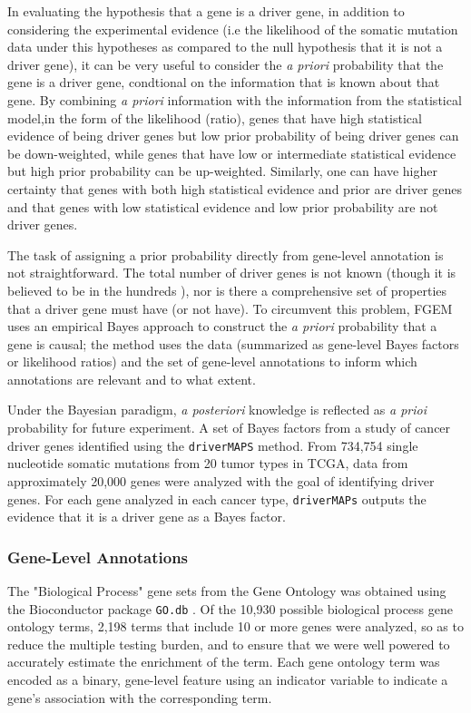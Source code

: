 In evaluating the hypothesis that a gene is a driver gene, in addition to considering the experimental evidence (i.e the likelihood of the somatic mutation data under this hypotheses as compared to the null hypothesis that it is not a driver gene), it can be very useful to consider the \emph{a priori} probability that the gene is a driver gene, condtional on the information that is known about that gene.  By combining \emph{a priori} information with the information from the statistical model,in the form of the likelihood (ratio), genes that have high statistical evidence of being driver genes but low prior probability of being driver genes can be down-weighted, while genes that have low or intermediate statistical evidence but high prior probability can be up-weighted.  Similarly, one can have higher certainty that genes with  both high statistical evidence and prior are driver genes and that genes with low statistical evidence and low prior probability are not driver genes.

The task of assigning a prior probability directly from gene-level annotation is not straightforward.  The total number of driver genes is not known (though it is believed to be in the hundreds \cite{Bailey_2018}), nor is there a comprehensive set of properties that a driver gene must have (or not have).  To circumvent this problem, FGEM uses an empirical Bayes approach to construct the \emph{a priori} probability that a gene is causal; the method uses the data (summarized as gene-level Bayes factors or likelihood ratios) and the set of gene-level annotations to inform which annotations are relevant and to what extent.

Under the Bayesian paradigm, \emph{a posteriori} knowledge is reflected as \emph{a prioi} probability for future experiment.  A set of Bayes factors from a study of cancer driver genes identified using the \texttt{driverMAPS} method\cite{drivermaps}.  From 734,754 single nucleotide somatic mutations from 20 tumor types in TCGA, data from approximately 20,000 genes were analyzed with the goal of identifying driver genes. For each gene analyzed in each cancer type, \texttt{driverMAPs} outputs the evidence that it is a driver gene as a Bayes factor.  

\subsubsection{Gene-Level Annotations}\label{sec:orgd117550}

The "Biological Process" gene sets from the Gene Ontology was obtained using the Bioconductor package \texttt{GO.db} \cite{godb}. Of the 10,930 possible biological process gene ontology terms, 2,198 terms that 
include 10 or more genes were analyzed, so as to reduce the multiple testing burden, and to ensure that we were well powered to accurately estimate the enrichment of the term.  Each gene ontology term was encoded as a binary, gene-level feature using an indicator variable to indicate a gene's association with the corresponding term. 


